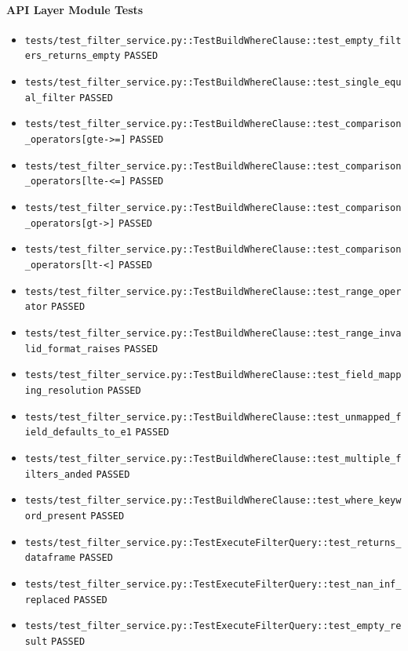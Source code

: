 \documentclass[12pt, titlepage]{article}
\begin{document}
\paragraph{API Layer Module Tests}
{\small
\begin{itemize}[leftmargin=1.5em, itemsep=0.2em, topsep=0.3em]
  \item \nolinkurl{tests/test_filter_service.py::TestBuildWhereClause::test_empty_filters_returns_empty} \texttt{PASSED}
  \item \nolinkurl{tests/test_filter_service.py::TestBuildWhereClause::test_single_equal_filter} \texttt{PASSED}
  \item \nolinkurl{tests/test_filter_service.py::TestBuildWhereClause::test_comparison_operators[gte->=]} \texttt{PASSED}
  \item \nolinkurl{tests/test_filter_service.py::TestBuildWhereClause::test_comparison_operators[lte-<=]} \texttt{PASSED}
  \item \nolinkurl{tests/test_filter_service.py::TestBuildWhereClause::test_comparison_operators[gt->]} \texttt{PASSED}
  \item \nolinkurl{tests/test_filter_service.py::TestBuildWhereClause::test_comparison_operators[lt-<]} \texttt{PASSED}
  \item \nolinkurl{tests/test_filter_service.py::TestBuildWhereClause::test_range_operator} \texttt{PASSED}
  \item \nolinkurl{tests/test_filter_service.py::TestBuildWhereClause::test_range_invalid_format_raises} \texttt{PASSED}
  \item \nolinkurl{tests/test_filter_service.py::TestBuildWhereClause::test_field_mapping_resolution} \texttt{PASSED}
  \item \nolinkurl{tests/test_filter_service.py::TestBuildWhereClause::test_unmapped_field_defaults_to_e1} \texttt{PASSED}
  \item \nolinkurl{tests/test_filter_service.py::TestBuildWhereClause::test_multiple_filters_anded} \texttt{PASSED}
  \item \nolinkurl{tests/test_filter_service.py::TestBuildWhereClause::test_where_keyword_present} \texttt{PASSED}
  \item \nolinkurl{tests/test_filter_service.py::TestExecuteFilterQuery::test_returns_dataframe} \texttt{PASSED}
  \item \nolinkurl{tests/test_filter_service.py::TestExecuteFilterQuery::test_nan_inf_replaced} \texttt{PASSED}
  \item \nolinkurl{tests/test_filter_service.py::TestExecuteFilterQuery::test_empty_result} \texttt{PASSED}

\end{itemize}}
\end{document}

